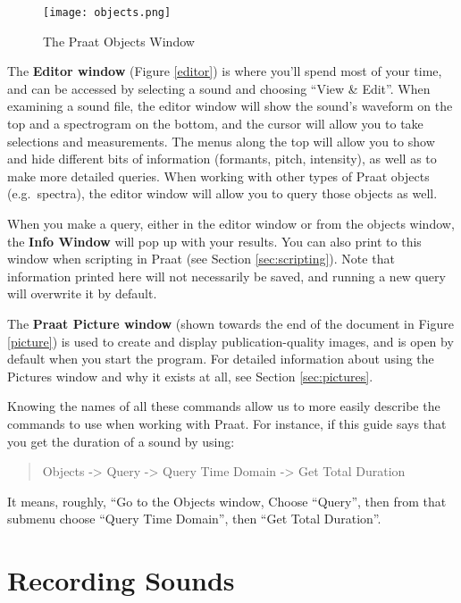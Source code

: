\begin{figure}
  \centerline{
    \mbox{\texttt{[image: objects.png]}}
  }
    \caption{The Praat Objects Window \label{objects}}
  
  \end{figure}

The \textbf{Editor window} (Figure \ref{editor}) is where you'll spend
most of your time, and can be accessed by selecting a sound and choosing
``View \& Edit''. When examining a sound file, the editor window will
show the sound's waveform on the top and a spectrogram on the bottom,
and the cursor will allow you to take selections and measurements. The
menus along the top will allow you to show and hide different bits of
information (formants, pitch, intensity), as well as to make more
detailed queries. When working with other types of Praat objects
(e.g.~spectra), the editor window will allow you to query those objects
as well.

When you make a query, either in the editor window or from the objects
window, the \textbf{Info Window} will pop up with your results. You can
also print to this window when scripting in Praat (see Section
\ref{sec:scripting}). Note that information printed here will not
necessarily be saved, and running a new query will overwrite it by
default.

The \textbf{Praat Picture window} (shown towards the end of the document
in Figure \ref{picture}) is used to create and display
publication-quality images, and is open by default when you start the
program. For detailed information about using the Pictures window and
why it exists at all, see Section \ref{sec:pictures}.

Knowing the names of all these commands allow us to more easily describe
the commands to use when working with Praat. For instance, if this guide
says that you get the duration of a sound by using:

\begin{quote}
Objects -\textgreater{} Query -\textgreater{} Query Time Domain
-\textgreater{} Get Total Duration
\end{quote}

It means, roughly, ``Go to the Objects window, Choose ``Query'', then
from that submenu choose ``Query Time Domain'', then ``Get Total
Duration''.

\hypertarget{recording-sounds}{%
\section{Recording Sounds}\label{recording-sounds}}

